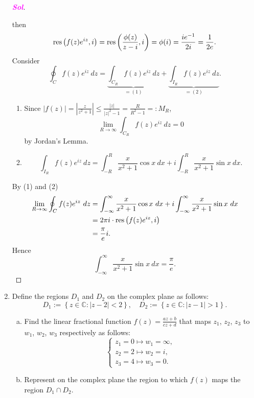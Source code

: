 \documentclass{article}
\theoremstyle{definition}
\newcommand{\set}[1]{\left\{#1\right\}}
\newcommand{\C}{\mathbb{C}}
\newcommand{\of}[1]{\left( #1 \right)}
\newcommand{\abs}[1]{\left\lvert #1 \right\rvert}
\newcommand{\sol}{\textcolor{magenta}{\bf Sol}}
\newcommand{\res}{\textnormal{res}}
\begin{document}
\begin{enumerate}[\bf 1.]
\begin{proof}[\sol]
\begin{center}
			\end{center} then \[
			\res\of{f(z)e^{iz},i}=\res\of{\frac{\phi(z)}{z-i},i}=\phi(i)=\frac{ie^{-1}}{2i}=\frac{1}{2e}.
			\] Consider $$
			\displaystyle\oint_C f(z)e^{iz}\ dz=\underbrace{\int_{C_R}f(z)e^{iz}\ dz}_{=(1)}+\underbrace{\int_{I_R}f(z)e^{iz}\ dz}_{=(2)}.
			$$ \begin{enumerate}[(1)]
				\item Since $\displaystyle \abs{f(z)}=\abs{\frac{z}{z^2+1}}\leq\frac{\abs{z}}{\abs{z}^2-1}=\frac{R}{R^2-1}=:M_R$, $$\lim\limits_{R\to\infty}\int_{C_R}f(z)e^{iz}\ dz=0$$ by Jordan's Lemma.
				\item \[
				\int_{I_R}f(z)e^{iz}\ dz=\int_{-R}^R\frac{x}{x^2+1}\cos x\ dx+i\int_{-R}^R\frac{x}{x^2+1}\sin x\ dx.
				\]
			\end{enumerate}
			By (1) and (2) \begin{align*}
			\lim\limits_{R\to\infty}\oint_C f(z)e^{iz}\ dz&=\int_{-\infty}^{\infty}\frac{x}{x^2+1}\cos x\ dx+i\int_{-\infty}^{\infty}\frac{x}{x^2+1}\sin x\ dx\\
			&=2\pi i\cdot\res\of{f(z)e^{iz}, i}\\
			&=\frac{\pi}{e}i.
			\end{align*} Hence \[
			\int_{-\infty}^{\infty}\frac{x}{x^2+1}\sin x\ dx=\frac{\pi}{e}.
			\]
		\end{proof}
		\newpage
		\item 
		Define the regions $D_1$ and $D_2$ on the complex plane as follows:\[
		D_1:=\set{z\in\C:\abs{z-2}<2},\quad D_2:=\set{z\in\C:\abs{z-1}>1}.
		\]
		\begin{enumerate}[(a)]
			\item Find the linear fractional function $f(z)=\displaystyle\frac{az+b}{cz+d}$ that maps $z_1$, $z_2$, $z_3$ to $w_1$, $w_2$, $w_3$ respectively as follows: \[
			\begin{cases}
			z_1=0\mapsto w_1=\infty,\\
			z_2=2\mapsto w_2=i,\\
			z_3=4\mapsto w_3=0.
			\end{cases}
			\]
			\item Represent on the complex plane the region to which $f(z)$ maps the region $D_1\cap D_2$.

\end{enumerate}
\end{enumerate}
\end{document}
